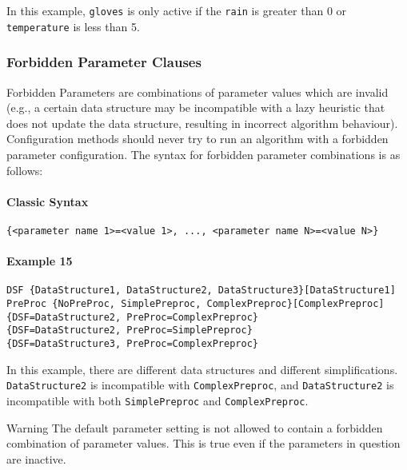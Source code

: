 \documentclass[manual.tex]{subfiles}
\begin{document}
In this example, \texttt{gloves} is only active if the \texttt{rain} is greater than 0 or \texttt{temperature} is less than 5.


\subsubsection{Forbidden Parameter Clauses}

Forbidden Parameters are combinations of parameter values which are invalid (e.g., a certain data structure may be incompatible with a lazy heuristic that does not update the data structure, resulting in incorrect algorithm behaviour).
%
Configuration methods should never try to run an algorithm with a forbidden parameter configuration. 
%
The syntax for forbidden parameter combinations is as follows:

\paragraph{Classic Syntax}

\begin{verbatim}
{<parameter name 1>=<value 1>, ..., <parameter name N>=<value N>}
\end{verbatim}

\paragraph{Example 15}
\begin{verbatim}
DSF {DataStructure1, DataStructure2, DataStructure3}[DataStructure1]
PreProc {NoPreProc, SimplePreproc, ComplexPreproc}[ComplexPreproc]
{DSF=DataStructure2, PreProc=ComplexPreproc}
{DSF=DataStructure2, PreProc=SimplePreproc}
{DSF=DataStructure3, PreProc=ComplexPreproc}
\end{verbatim}

In this example, there are different data structures and different simplifications.
\texttt{DataStructure2} is incompatible with \texttt{ComplexPreproc}, and 
\texttt{DataStructure2} is incompatible with both \texttt{SimplePreproc} and \texttt{ComplexPreproc}.

\begin{bclogo}[logo=\bcattention, couleurBarre=red, noborder=true]{Warning}
The default parameter setting is not allowed to contain a forbidden combination of parameter values. This is true even if the parameters in question are inactive.
\end{bclogo}
\end{document}
